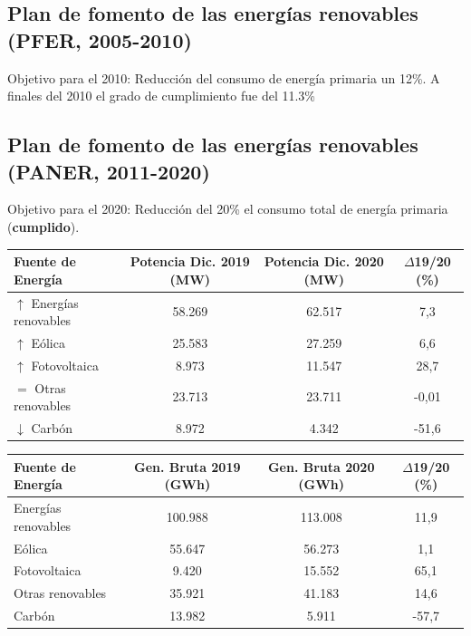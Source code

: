 	\subsection{Plan de fomento de las energías renovables (PFER, 2005-2010)}
		Objetivo para el 2010: Reducción del consumo de energía primaria un 12\%. A finales del 2010 el
		grado de cumplimiento fue del 11.3\%
	
	\subsection{Plan de fomento de las energías renovables (PANER, 2011-2020)}
		Objetivo para el 2020: Reducción del 20\% el consumo total de energía primaria (\textbf{cumplido}).

		\begin{table}[H]
			\centering
			\begin{tabular}{lccc}
				\hline
				\textbf{Fuente de Energía} & \textbf{Potencia Dic. 2019 (MW)} & \textbf{Potencia Dic. 2020 (MW)} & \textbf{$\Delta$19/20 (\%)} \\
				\hline
				$\uparrow$ Energías renovables & 58.269 & 62.517 & 7,3 \\
				\quad $\uparrow$ Eólica & 25.583 & 27.259 & 6,6 \\
				\quad $\uparrow$ Fotovoltaica & 8.973 & 11.547 & 28,7 \\
				\quad $=$ Otras renovables & 23.713 & 23.711 & -0,01 \\
				$\downarrow$ Carbón & 8.972 & 4.342 & -51,6 \\
				\hline
			\end{tabular}
		\end{table}
		
		\begin{table}[H]
			\centering
			\begin{tabular}{lccc}
				\toprule
				\textbf{Fuente de Energía} & \textbf{Gen. Bruta 2019 (GWh)} & \textbf{Gen. Bruta 2020 (GWh)} & \textbf{$\Delta$19/20 (\%)} \\
				\midrule
				Energías renovables & 100.988 & 113.008 & 11,9 \\
				\quad Eólica & 55.647 & 56.273 & 1,1 \\
				\quad Fotovoltaica & 9.420 & 15.552 & 65,1 \\
				\quad Otras renovables & 35.921 & 41.183 & 14,6 \\
				Carbón & 13.982 & 5.911 & -57,7 \\
				\bottomrule
			\end{tabular}
		\end{table}
		
